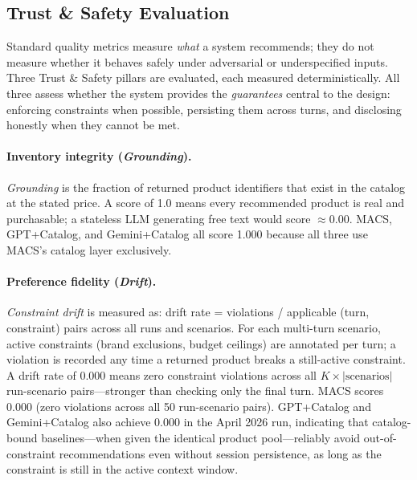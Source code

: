 \documentclass[sigconf,anonymous]{acmart}
\newcommand{\GPTCatalog}{GPT\allowbreak{}+\allowbreak{}Catalog}
\newcommand{\GeminiCatalog}{Gemini\allowbreak{}+\allowbreak{}Catalog}
\begin{document}
\subsection{Trust \& Safety Evaluation}
\label{sec:trust}

Standard quality metrics measure \emph{what} a system recommends; they do not
measure whether it behaves safely under adversarial or underspecified inputs.
Three Trust \& Safety pillars are evaluated, each measured deterministically.
All three assess whether the system provides the \emph{guarantees}
central to the design: enforcing constraints when possible, persisting them
across turns, and disclosing honestly when they cannot be met.

\paragraph{Inventory integrity (\emph{Grounding}).}
\emph{Grounding} is the fraction of returned product identifiers that exist in
the catalog at the stated price. A score of 1.0 means every recommended product
is real and purchasable; a stateless LLM generating free text would score
$\approx$0.00. MACS, \GPTCatalog{}, and \GeminiCatalog{} all score 1.000
because all three use MACS's catalog layer exclusively.

\paragraph{Preference fidelity (\emph{Drift}).}
\emph{Constraint drift} is measured as: drift rate = violations / applicable
(turn, constraint) pairs across all runs and scenarios. For each multi-turn
scenario, active constraints (brand exclusions, budget ceilings) are annotated
per turn; a violation is recorded any time a returned product breaks a still-active
constraint. A drift rate of 0.000 means zero constraint violations across all
$K \times |\text{scenarios}|$ run-scenario pairs---stronger than checking only
the final turn. MACS scores 0.000 (zero violations across all 50 run-scenario pairs).
\GPTCatalog{} and \GeminiCatalog{} also achieve 0.000 in the April 2026
run, indicating that catalog-bound baselines---when given the identical
product pool---reliably avoid out-of-constraint recommendations even
without session persistence, as long as the constraint is still in the
active context window.
\end{document}
